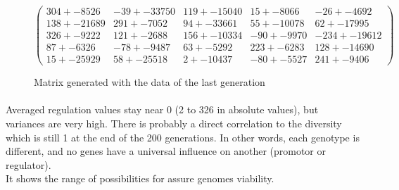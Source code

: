 \documentclass[]{report} %
\begin{document}
    \begin{figure}[H] 
            \centering
            \small
    $
            \begin{pmatrix}
                304 +- 8526 & -39 +- 33750 & 119 +- 15040 & 15 +- 8066 & -26 +- 4692 \\
                138 +- 21689 & 291 +- 7052 & 94 +- 33661 & 55 +- 10078 & 62 +- 17995 \\
                326 +- 9222 & 121 +- 2688 & 156 +- 10334 & -90 +- 9970 & -234 +- 19612 \\
                87 +- 6326 & -78 +- 9487 & 63 +- 5292 & 223 +- 6283 & 128 +- 14690 \\
                15 +- 25929 & 58 +- 25518 & 2 +- 10437 & -80 +- 5527 & 241 +- 9406 
            \end{pmatrix}
    $
            \caption{\footnotesize Matrix generated with the data of the last generation}
            \label{mat:ps300xg200xmr1-10-0}
    \end{figure}
    \paragraph*{}
    Averaged regulation values stay near 0 (2 to 326 in absolute values), but variances are very high. There is probably a direct correlation to the diversity which is still 1 at the end of the 200 generations. 
    In other words, each genotype is different, and no genes have a universal influence on another (promotor or regulator).\\
    It shows the range of possibilities for assure genomes viability.
    
    
    \newpage
\end{document}
